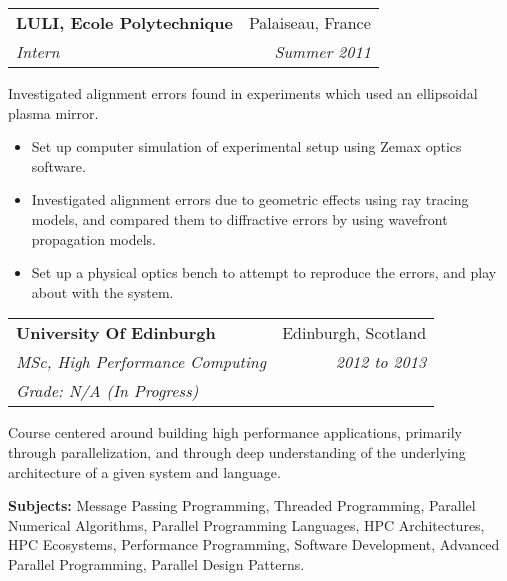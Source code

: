 \documentclass[11pt]{article}
\makeatletter
\newcommand{\resumeSection}[1]{
    \par
    \vspace{\baselineskip}
    \large {\sc {#1}}
    \par
    \vspace{-0.9\baselineskip}
    \hrulefill
    \vspace{0.5\baselineskip}
    \par
}
\newenvironment{resumeSubSectionHeader}{
    \par
    \begin{tabular*}{\textwidth}{l@{\extracolsep{\fill}}r}
    \par
} {
    \end{tabular*}
    \par
}
\newenvironment{resumeSubSectionBody}{
    \par
    \vspace{-0.8\parskip}
    \begin{small}
    \par
} {
    \par
    \end{small}
    \par
}
\makeatother
\begin{document}
\begin{resumeSubSectionHeader}
    \textbf{LULI, Ecole Polytechnique} & Palaiseau, France \\
    \emph{Intern} & \emph{Summer 2011}
\end{resumeSubSectionHeader}
\begin{resumeSubSectionBody}
    Investigated alignment errors found in experiments which used an
    ellipsoidal plasma mirror.

    \begin{itemize}
        \item
            Set up computer simulation of experimental setup using
            Zemax optics software.

        \item
            Investigated alignment errors due to geometric effects
            using ray tracing models, and compared them
            to diffractive errors by using wavefront propagation models.

        \item
            Set up a physical optics bench to attempt to reproduce the
            errors, and play about with the system.
    \end{itemize}
\end{resumeSubSectionBody}


\resumeSection{Education \& Training}


\begin{resumeSubSectionHeader}
    \textbf{University Of Edinburgh} & Edinburgh, Scotland\\
    \emph{MSc, High Performance Computing} & \emph{2012 to 2013} \\
    \emph{Grade: N/A (In Progress)}
\end{resumeSubSectionHeader}
\begin{resumeSubSectionBody}
    Course centered around building high performance applications,
    primarily through parallelization, and through deep understanding
    of the underlying architecture of a given system and language.

    \begin{description}
        \item{\bf Subjects:}
            Message Passing Programming, Threaded Programming,
            Parallel Numerical Algorithms,
            Parallel Programming Languages, HPC Architectures,
            HPC Ecosystems, Performance Programming,
            Software Development, Advanced Parallel Programming,
            Parallel Design Patterns.
    \end{description}
\end{resumeSubSectionBody}
\end{document}

